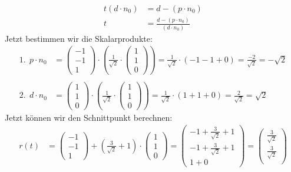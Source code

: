 \documentclass[11pt]{article}
\begin{document}
\begin{enumerate}
\begin{align*}
  t(d \cdot n_0) &= d - (p \cdot n_0) \\
  t &= \frac{d - (p \cdot n_0)}{(d \cdot n_0)}
\end{align*}
Jetzt bestimmen wir die Skalarprodukte: 
\begin{align*}
  1.~~p \cdot n_0 &= \begin{pmatrix*}
    -1\\
    -1\\
    1
  \end{pmatrix*} \cdot \left( \frac{1}{\sqrt{2}} \cdot \begin{pmatrix*}
    1\\
    1\\
    0
  \end{pmatrix*} \right) = \frac{1}{\sqrt{2}} \cdot (-1 -1 + 0) = \frac{-2}{\sqrt{2}} = -\sqrt{2} \\ \\
  2.~~d \cdot n_0 &= \begin{pmatrix*}
    1\\
    1\\
    0
  \end{pmatrix*} \cdot \left( \frac{1}{\sqrt{2}} \cdot \begin{pmatrix*}
    1\\
    1\\
    0
  \end{pmatrix*} \right) = \frac{1}{\sqrt{2}} \cdot (1 + 1 + 0) = \frac{2}{\sqrt{2}} = \sqrt{2}
\end{align*}
Jetzt können wir den Schnittpunkt berechnen: 
\begin{align*}
  r(t) &= \begin{pmatrix*}
    -1\\
    -1\\
    1
  \end{pmatrix*} + \left( \frac{3}{\sqrt{2}} + 1 \right) \cdot \begin{pmatrix*}
    1\\
    1\\
    0
  \end{pmatrix*} = \begin{pmatrix*}
    -1 +\frac{3}{\sqrt{2}} + 1\\
    -1 +\frac{3}{\sqrt{2}} + 1\\
    1 + 0
  \end{pmatrix*}  = \begin{pmatrix*}
    \frac{3}{\sqrt{2}} \\
    \frac{3}{\sqrt{2}} \\

\end{pmatrix*}
\end{align*}
\end{enumerate}
\end{document}
